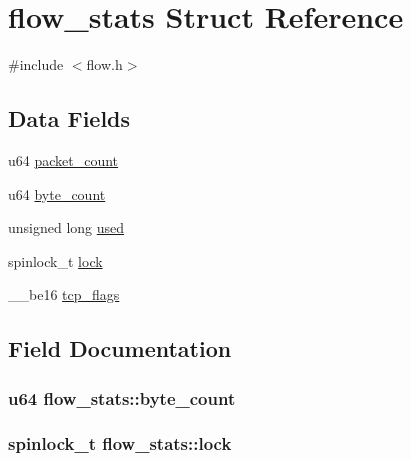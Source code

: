 \hypertarget{structflow__stats}{}\section{flow\+\_\+stats Struct Reference}
\label{structflow__stats}


{\ttfamily \#include $<$flow.\+h$>$}

\subsection*{Data Fields}
\begin{DoxyCompactItemize}
\item 
u64 \hyperlink{structflow__stats_a9399b2cdc3d48c11357fbc2aaff33226}{packet\+\_\+count}
\item 
u64 \hyperlink{structflow__stats_a97844fc570ddb0d4b80f4cfe36bfee29}{byte\+\_\+count}
\item 
unsigned long \hyperlink{structflow__stats_a3eefc54cf53ad3e24bb070bd6f251f50}{used}
\item 
spinlock\+\_\+t \hyperlink{structflow__stats_a1930f864d7fc52f4afeb86714e3e5c07}{lock}
\item 
\+\_\+\+\_\+be16 \hyperlink{structflow__stats_a2b2812adf4fd5f4f188324fdf503deba}{tcp\+\_\+flags}
\end{DoxyCompactItemize}


\subsection{Field Documentation}
\hypertarget{structflow__stats_a97844fc570ddb0d4b80f4cfe36bfee29}{}
\subsubsection[{byte\+\_\+count}]{\setlength{\rightskip}{0pt plus 5cm}u64 flow\+\_\+stats\+::byte\+\_\+count}\label{structflow__stats_a97844fc570ddb0d4b80f4cfe36bfee29}
\hypertarget{structflow__stats_a1930f864d7fc52f4afeb86714e3e5c07}{}
\subsubsection[{lock}]{\setlength{\rightskip}{0pt plus 5cm}spinlock\+\_\+t flow\+\_\+stats\+::lock}\label{structflow__stats_a1930f864d7fc52f4afeb86714e3e5c07}
\hypertarget{structflow__stats_a9399b2cdc3d48c11357fbc2aaff33226}{}
